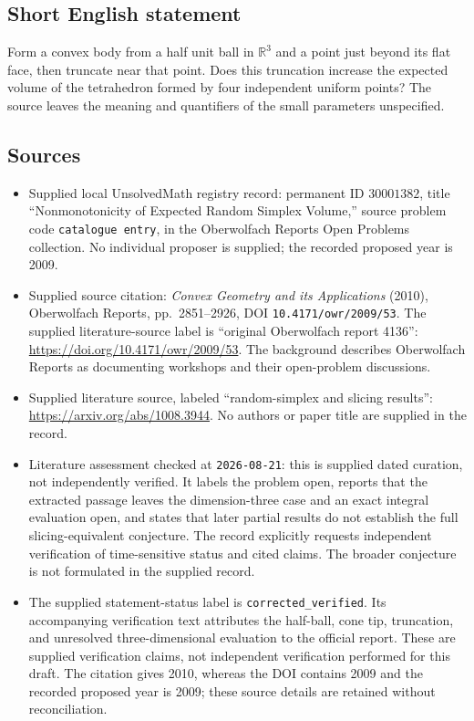 \documentclass[11pt]{article}
\newcommand{\R}{\mathbb{R}}
\begin{document}
\subsection{Short English statement}
Form a convex body from a half unit ball in \(\R^3\) and a point just beyond its flat face, then truncate near that point. Does this truncation increase the expected volume of the tetrahedron formed by four independent uniform points? The source leaves the meaning and quantifiers of the small parameters unspecified.
\subsection{Sources}
\begin{itemize}
\item Supplied local UnsolvedMath registry record: permanent ID \(30001382\), title ``Nonmonotonicity of Expected Random Simplex Volume,'' source problem code \texttt{catalogue entry}, in the Oberwolfach Reports Open Problems collection. No individual proposer is supplied; the recorded proposed year is 2009.
\item Supplied source citation: \emph{Convex Geometry and its Applications} (2010), Oberwolfach Reports, pp.~2851--2926, DOI \texttt{10.4171/owr/2009/53}. The supplied literature-source label is ``original Oberwolfach report 4136'': \url{https://doi.org/10.4171/owr/2009/53}. The background describes Oberwolfach Reports as documenting workshops and their open-problem discussions.
\item Supplied literature source, labeled ``random-simplex and slicing results'': \url{https://arxiv.org/abs/1008.3944}. No authors or paper title are supplied in the record.
\item Literature assessment checked at \texttt{2026-08-21}: this is supplied dated curation, not independently verified. It labels the problem open, reports that the extracted passage leaves the dimension-three case and an exact integral evaluation open, and states that later partial results do not establish the full slicing-equivalent conjecture. The record explicitly requests independent verification of time-sensitive status and cited claims. The broader conjecture is not formulated in the supplied record.
\item The supplied statement-status label is \texttt{corrected\_verified}. Its accompanying verification text attributes the half-ball, cone tip, truncation, and unresolved three-dimensional evaluation to the official report. These are supplied verification claims, not independent verification performed for this draft. The citation gives 2010, whereas the DOI contains 2009 and the recorded proposed year is 2009; these source details are retained without reconciliation.
\end{itemize}
\end{document}
